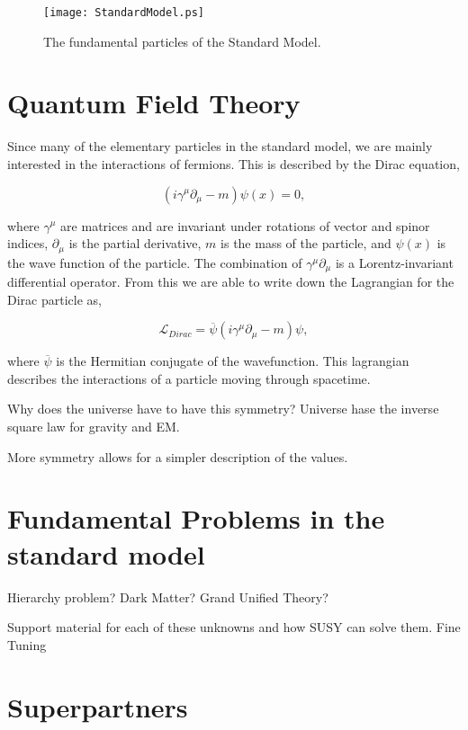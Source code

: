 \begin{figure}
 	\centering
	\texttt{[image: StandardModel.ps]}
 	\caption{The fundamental particles of the Standard Model.}
 	\label{SMParticles} 
\end{figure}
 
 \section{Quantum Field Theory}
 \label{QFT}
 
 Since many of the elementary particles in the standard model, we are mainly interested in the interactions of fermions. This is described by the Dirac equation, 
 
\begin{equation}
(i\gamma^\mu\partial_\mu-m)\psi(x)=0\label{Dirac},
\end{equation}

where $\gamma^\mu$ are matrices and are invariant under rotations of vector and spinor indices, $\partial_\mu$ is the partial derivative, $m$ is the mass of the particle, and $\psi(x)$ is the wave function of the particle. The combination of $\gamma^\mu\partial_\mu$ is a Lorentz-invariant differential operator. From this we are able to write down the Lagrangian for the Dirac particle as, 

\begin{equation}
\mathcal{L}_{Dirac}=\overline{\psi}(i\gamma^\mu\partial_\mu-m)\psi,
\end{equation}
 
 where $\overline{\psi}$ is the Hermitian conjugate of the wavefunction. This lagrangian describes the interactions of a particle moving through spacetime. 

Why does the universe have to have this symmetry?
Universe hase the inverse square law for gravity and EM.

More symmetry allows for a simpler description of the values. 

\section{Fundamental Problems in the standard model}
\label{sec:Hierarchy}

Hierarchy problem?
Dark Matter?
Grand Unified Theory?

Support material for each of these unknowns and how SUSY can solve them. Fine Tuning

\section{Superpartners}
\label{sec:superpartners}

